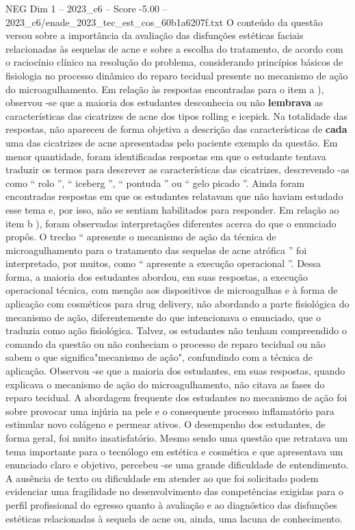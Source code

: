 \begin{textsample}{NEG Dim 1 – 2023\_c6 – Score -5.00 – 2023\_c6/enade\_2023\_tec\_est\_cos\_60b1a6207f.txt}
O conteúdo da questão versou sobre a importância da avaliação das disfunções estéticas faciais relacionadas às sequelas de acne e sobre a escolha do tratamento, de acordo com o raciocínio clínico na resolução do problema, considerando princípios básicos de fisiologia no processo dinâmico do reparo tecidual presente no mecanismo de ação do microagulhamento.
Em relação às respostas encontradas para o item a ), observou -se que a maioria dos estudantes desconhecia ou não \textbf{lembrava} as características das cicatrizes de acne dos tipos rolling e icepick.
Na totalidade das respostas, não apareceu de forma objetiva a descrição das características de \textbf{cada} uma das cicatrizes de acne apresentadas pelo paciente exemplo da questão.
Em menor quantidade, foram identificadas respostas em que o estudante tentava traduzir os termos para descrever as características das cicatrizes, descrevendo -as como “ rolo ”, “ iceberg ”, “ pontuda ” ou “ gelo picado ”.
Ainda foram encontradas respostas em que os estudantes relatavam que não haviam estudado esse tema e, por isso, não se sentiam habilitados para responder.
Em relação ao item b ), foram observadas interpretações diferentes acerca do que o enunciado propôs.
O trecho “ apresente o mecanismo de ação da técnica de microagulhamento para o tratamento das sequelas de acne atrófica ” foi interpretado, por muitos, como “ apresente a execução operacional ”.
Dessa forma, a maioria dos estudantes abordou, em suas respostas, a execução operacional técnica, com menção aos dispositivos de microagulhas e à forma de aplicação com cosméticos para drug delivery, não abordando a parte fisiológica do mecanismo de ação, diferentemente do que intencionava o enunciado, que o traduzia como ação fisiológica.
Talvez, os estudantes não tenham compreendido o comando da questão ou não conheciam o processo de reparo tecidual ou não sabem o que significa"mecanismo de ação", confundindo com a técnica de aplicação.
Observou -se que a maioria dos estudantes, em suas respostas, quando explicava o mecanismo de ação do microagulhamento, não citava as fases do reparo tecidual.
A abordagem frequente dos estudantes no mecanismo de ação foi sobre provocar uma injúria na pele e o consequente processo inflamatório para estimular novo colágeno e permear ativos.
O desempenho dos estudantes, de forma geral, foi muito insatisfatório.
Mesmo sendo uma questão que retratava um tema importante para o tecnólogo em estética e cosmética e que apresentava um enunciado claro e objetivo, percebeu -se uma grande dificuldade de entendimento.
A ausência de texto ou dificuldade em atender ao que foi solicitado podem evidenciar uma fragilidade no desenvolvimento das competências exigidas para o perfil profissional do egresso quanto à avaliação e ao diagnóstico das disfunções estéticas relacionadas à sequela de acne ou, ainda, uma lacuna de conhecimento.

\end{textsample}
